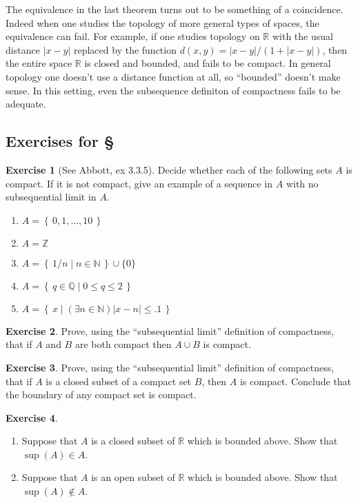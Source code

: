 \documentclass[11pt,oneside]{amsbook}
\newcommand{\set}[1]{\left\{\,#1\,\right\}}
\newcommand{\N}{\mathbb N}
\newcommand{\Z}{\mathbb Z}
\newcommand{\Q}{\mathbb Q}
\newcommand{\R}{\mathbb R}
\theoremstyle{definition}
\newtheorem{exerc}{Exercise}[section]
\theoremstyle{plain}
\theoremstyle{definition}
\theoremstyle{remark}
\numberwithin{equation}{section}
\numberwithin{figure}{section}
\begin{document}
The equivalence in the last theorem turns out to be something of a coincidence. Indeed when one studies the topology of more general types of spaces, the equivalence can fail. For example, if one studies topology on $\R$ with the usual distance $|x-y|$ replaced by the function $d(x,y)=|x-y|/(1+|x-y|)$, then the entire space $\R$ is closed and bounded, and fails to be compact. In general topology one doesn't use a distance function at all, so ``bounded'' doesn't make sense. In this setting, even the subsequence definiton of compactness fails to be adequate.

\newpage
\subsection*{Exercises for \S \thesection}

\begin{exerc}[See Abbott, ex 3.3.5]
  Decide whether each of the following sets $A$ is compact. If it is not compact, give an example of a sequence in $A$ with no subsequential limit in $A$.
  \begin{enumerate}
    \item $A=\set{0,1,\ldots,10}$
    \item $A=\Z$
    \item $A=\set{1/n\mid n\in\N}\cup\{0\}$
    \item $A=\set{q\in\Q\mid0\leq q\leq2}$
    \item $A=\set{x\mid (\exists n\in\N) |x-n|\leq.1}$
  \end{enumerate}
\end{exerc}

\begin{exerc}
  Prove, using the ``subsequential limit'' definition of compactness, that if $A$ and $B$ are both compact then $A\cup B$ is compact.
\end{exerc}

\begin{exerc}
  Prove, using the ``subsequential limit'' definition of compactness, that if $A$ is a closed subset of a compact set $B$, then $A$ is compact. Conclude that the boundary of any compact set is compact.
\end{exerc}

\begin{exerc}
  \begin{enumerate}
    \item Suppose that $A$ is a closed subset of $\R$ which is bounded above. Show that $\sup(A)\in A$.
    \item Suppose that $A$ is an open subset of $\R$ which is bounded above. Show that $\sup(A)\notin A$.
  \end{enumerate}
\end{exerc}
\end{document}
